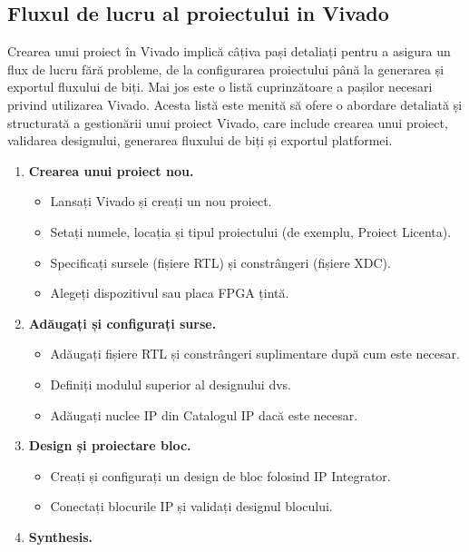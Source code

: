 \documentclass[12pt]{article}
\begin{document}
\subsection{Fluxul de lucru al proiectului in Vivado}
\hspace*{1cm}Crearea unui proiect în Vivado implică câțiva pași detaliați pentru a asigura un flux de lucru fără probleme, de la configurarea proiectului până la generarea și exportul fluxului de biți. Mai jos este o listă cuprinzătoare a pașilor necesari privind utilizarea Vivado. Acesta listă este menită să ofere o abordare detaliată și structurată a gestionării unui proiect Vivado, care include crearea unui proiect, validarea designului, generarea fluxului de biți și exportul platformei.
\begin{enumerate}
    \item \textbf{Crearea unui proiect nou.} 
        \begin{itemize}
            \item Lansați Vivado și creați un nou proiect.
            \item Setați numele, locația și tipul proiectului (de exemplu, Proiect Licenta).
            \item Specificați sursele (fișiere RTL) și constrângeri (fișiere XDC).
            \item Alegeți dispozitivul sau placa FPGA țintă.
        \end{itemize}
    \item \textbf{Adăugați și configurați surse.} 
        \begin{itemize}
            \item Adăugați fișiere RTL și constrângeri suplimentare după cum este necesar.
            \item Definiți modulul superior al designului dvs.
            \item Adăugați nuclee IP din Catalogul IP dacă este necesar.
        \end{itemize}
    \item \textbf{Design și proiectare bloc.} 
        \begin{itemize}
            \item Creați și configurați un design de bloc folosind IP Integrator.
            \item Conectați blocurile IP și validați designul blocului.
        \end{itemize}
    \item \textbf{Synthesis.} 
        \begin{itemize}

\end{itemize}
\end{enumerate}
\end{document}
